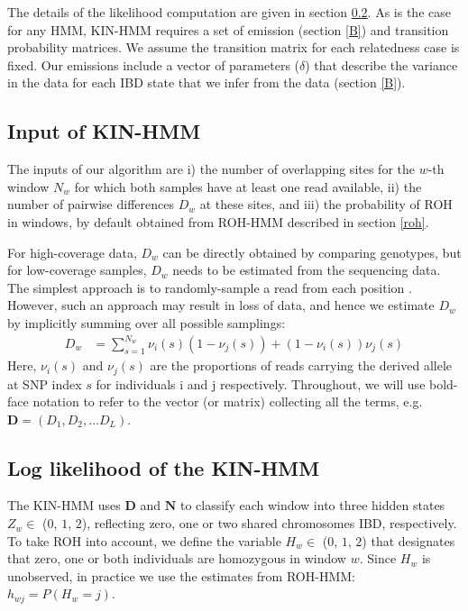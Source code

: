 \documentclass[12pt, letterpaper]{article}
\newcommand{\BD}{\mathbf{D}}
\newcommand{\BN}{\mathbf{N}}
\begin{document}
The details of the likelihood computation are given in section \ref{ll}. As is the case for any HMM, KIN-HMM requires a set of emission (section \ref{B}) and transition probability matrices. We assume the transition matrix for each relatedness case is fixed. Our emissions include a vector of parameters ($\delta$) that describe the variance in the data for each IBD state that we infer from the data (section \ref{B}).

\subsection{Input of KIN-HMM}\label{hmm_input}
The inputs of our algorithm are i) the number of overlapping sites for the $w$-th window $N_w$ for which both samples have at least one read available, ii) the number of pairwise differences $D_w$ at these sites, and iii) the probability of ROH in windows, by default obtained from ROH-HMM described in section \ref{roh}.

For high-coverage data, $D_w$ can be directly obtained by comparing genotypes, but for low-coverage samples, $D_w$ needs to be estimated from the sequencing data. The simplest approach is to randomly-sample a read from each position \cite{haak_massive_2015,prufer_complete_2014,green_draft_2010}. However, such an approach may result in loss of data, and hence we estimate $D_w$ by implicitly summing over all possible samplings:
\begin{align}\label{eq:x}
D_w &= \sum_{s=1}^{N_w} \nu_i(s) (1-\nu_j(s)) + (1-\nu_i(s)) \nu_j(s)
\end{align}
Here, $\nu_i(s)$ and $\nu_j(s)$ are the proportions of reads carrying the derived allele at SNP index $s$ for individuals i and j respectively.
Throughout, we will use bold-face notation to refer to the vector (or matrix) collecting  all the terms, e.g. $\BD = (D_1, D_2, \dots D_L)$.


\subsection{Log likelihood of the KIN-HMM}\label{ll}
The KIN-HMM uses $\BD$ and $\BN$ to classify each window into three hidden states $Z_w \in$ ($0$, $1$, $2$), reflecting zero, one or two shared chromosomes IBD, respectively. To take ROH into account, we define the variable $H_w \in$ ($0$, $1$, $2$) that designates that zero, one or both individuals are homozygous in window $w$. Since $H_w$ is unobserved, in practice we use the estimates from ROH-HMM: $h_{wj} = P(H_w = j)$.
\end{document}
